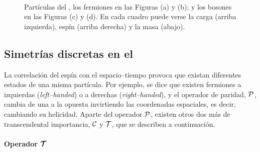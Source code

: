 \begin{figure}[H]
\centering
{} \phantom{olaola}
\\
%
\phantom{ola}
\caption{Partículas del \stdmod, los fermiones en las Figuras (a) y (b); y los bosones en las Figuras (c) y (d). En cada cuadro puede verse la carga (arriba izquierda), espín (arriba derecha) y la masa (abajo).} \label{stdmod_particles}
\end{figure}


\color{new}
\subsection{Simetrías discretas en el \stdmod} %

La correlación del espín con el espacio--tiempo provoca que existan diferentes estados de una misma partícula. Por ejemplo, se dice que existen fermiones a izquierdas (\emph{left--handed}) o a derechas (\emph{right--handed}), y el operador de paridad, $\mathcal{P}$, cambia de una a la opuesta invirtiendo las coordenadas espaciales, es decir, cambiando su helicidad. Aparte del operador $\mathcal{P}$, existen otros dos más de transcendental importancia, $\mathcal{C}$ y $\mathcal{T}$, que se describen a continuación. 



\paragraph{Operador $\bm{\mathsf{\mathcal{T}}}$}

